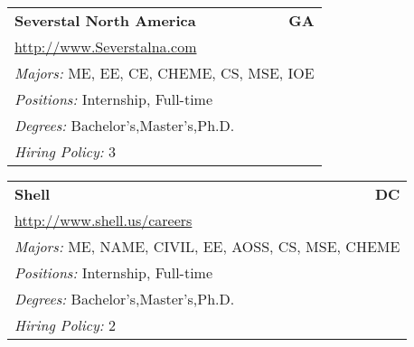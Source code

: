 \documentclass[twoside]{article}
\begin{document}
\begin{center}
\begin{multicols}{3}
\begin{FlushLeft}
\begin{minipage}{.9\columnwidth}
\end{minipage}
 
\begin{minipage}{.9\columnwidth}\begin{tabularx}{.95\columnwidth}{Xr}
                 {\Large\bf Severstal North America} & {\Large\bf GA}\\
    \multicolumn{2}{p{.95\columnwidth}}{\url{http://www.Severstalna.com}}\\
    \multicolumn{2}{p{.95\columnwidth}}{\emph{Majors:} ME, EE, CE, CHEME, CS, MSE, IOE}\\
    \multicolumn{2}{p{.95\columnwidth}}{\emph{Positions:} Internship, Full-time}\\
    \multicolumn{2}{p{.95\columnwidth}}{\emph{Degrees:} Bachelor's,Master's,Ph.D.}\\
    \multicolumn{2}{p{.95\columnwidth}}{\emph{Hiring Policy:} 3}\\
    \end{tabularx}
    
\end{minipage}
 
\begin{minipage}{.9\columnwidth}\begin{tabularx}{.95\columnwidth}{Xr}
                 {\Large\bf Shell} & {\Large\bf DC}\\
    \multicolumn{2}{p{.95\columnwidth}}{\url{http://www.shell.us/careers}}\\
    \multicolumn{2}{p{.95\columnwidth}}{\emph{Majors:} ME, NAME, CIVIL, EE, AOSS, CS, MSE, CHEME}\\
    \multicolumn{2}{p{.95\columnwidth}}{\emph{Positions:} Internship, Full-time}\\
    \multicolumn{2}{p{.95\columnwidth}}{\emph{Degrees:} Bachelor's,Master's,Ph.D.}\\
    \multicolumn{2}{p{.95\columnwidth}}{\emph{Hiring Policy:} 2}\\
    \end{tabularx}
    
\end{minipage}
 

\end{FlushLeft}
\end{multicols}
\end{center}
\end{document}
